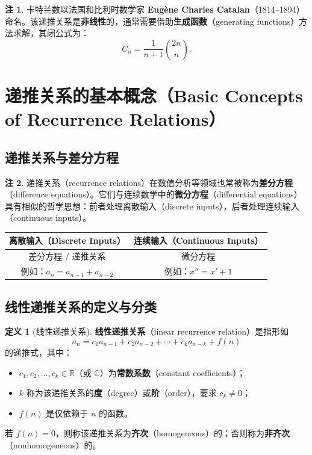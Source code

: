 \documentclass[UTF8,11pt,a4paper]{ctexbook}   %
\theoremstyle{definition}
\newtheorem{definition}{定义}[section]
\newtheorem{remark}{注}[section]
\begin{document}
\begin{remark}
卡特兰数以法国和比利时数学家 \textbf{Eugène Charles Catalan}（1814--1894）命名。该递推关系是\textbf{非线性}的，通常需要借助\textbf{生成函数}（generating functions）方法求解，其闭公式为：
\[
C_n = \frac{1}{n+1}\binom{2n}{n}.
\]
\end{remark}

\section{递推关系的基本概念（Basic Concepts of Recurrence Relations）}

\subsection{递推关系与差分方程}

\begin{remark}
递推关系（recurrence relations）在数值分析等领域也常被称为\textbf{差分方程}（difference equations）。它们与连续数学中的\textbf{微分方程}（differential equations）具有相似的哲学思想：前者处理离散输入（discrete inputs），后者处理连续输入（continuous inputs）。

\begin{table}[htbp]
\centering
\begin{tabular}{|c|c|}
\hline
\textbf{离散输入}（Discrete Inputs） & \textbf{连续输入}（Continuous Inputs） \\
\hline
差分方程 / 递推关系 & 微分方程 \\
\hline
例如：$a_n = a_{n-1} + a_{n-2}$ & 例如：$x'' = x' + 1$ \\
\hline
\end{tabular}
\end{table}
\end{remark}

\subsection{线性递推关系的定义与分类}

\begin{definition}[线性递推关系]
\textbf{线性递推关系}（linear recurrence relation）是指形如
\[
a_n = c_1 a_{n-1} + c_2 a_{n-2} + \cdots + c_k a_{n-k} + f(n)
\]
的递推式，其中：
\begin{itemize}
    \item $c_1, c_2, \dots, c_k \in \mathbb{R}$（或 $\mathbb{C}$）为\textbf{常数系数}（constant coefficients）；
    \item $k$ 称为该递推关系的\textbf{度}（degree）或\textbf{阶}（order），要求 $c_k \neq 0$；
    \item $f(n)$ 是仅依赖于 $n$ 的函数。
\end{itemize}

若 $f(n) = 0$，则称该递推关系为\textbf{齐次}（homogeneous）的；否则称为\textbf{非齐次}（nonhomogeneous）的。
\end{definition}
\end{document}
